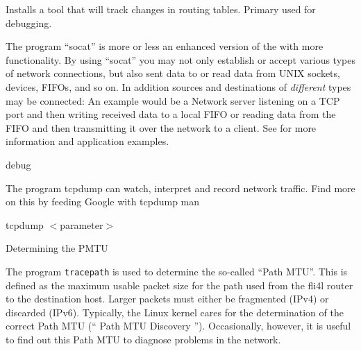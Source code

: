 \begin{description}
        Installs a tool that will track changes in routing tables.
        Primary used for debugging.


    The program ``socat'' is more or less an enhanced version of the
     with more functionality. By using
    ``socat'' you may not only establish or accept various types of
    network connections, but also sent data to or read data from UNIX
    sockets, devices, FIFOs, and so on. In addition sources and destinations
    of \emph{different} types may be connected:
    An example would be a Network server listening on a TCP port and
    then writing received data to a local FIFO or reading data from the FIFO
    and then transmitting it over the network to a client. See
    for more information and application examples.

 debug

    The program tcpdump can watch, interpret and record network traffic.
    Find more on this by feeding Google with
    \grqq{}tcpdump man\grqq{}

    tcpdump $<$parameter$>$

 Determining the PMTU

    The program \texttt{tracepath} is used to determine
    the so-called ``Path MTU''. This is defined as the maximum usable packet size
    for the path used from the fli4l router to the destination host. Larger packets
    must either be fragmented (IPv4) or discarded (IPv6).
    Typically, the Linux kernel cares for the determination of the correct
    Path MTU (`` Path MTU Discovery ''). Occasionally, however, it is
    useful to find out this Path MTU to diagnose problems in the network.
    

\end{description}

